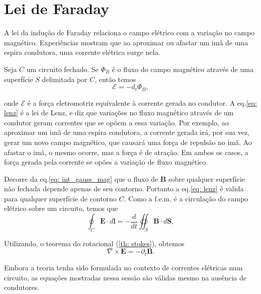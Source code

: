 \section{Lei de Faraday}

A lei da indução de Faraday relaciona o campo elétrico com a variação no campo magnético. Experiências mostram que ao aproximar ou afastar um imâ de uma espira condutora, uma corrente elétrica surge nela. 

Seja $C$ um circuito fechado. Se $\Phi_B$ é o fluxo do campo magnético através de uma superfície $S$ delimitada por $C$, então temos
\begin{equation}
\mathcal{E} = -d_t\Phi_B, 
\label{eq: lenz}
\end{equation}

\noindent onde $\mathcal{E}$ é a força eletromotriz equivalente à corrente gerada no condutor. A eq.\eqref{eq: lenz} é a lei de Lenz, e diz que variações no fluxo magnético através de um condutor geram correntes que se opõem a essa variação. Por exemplo, ao aproximar um imã de uma espira condutora, a corrente gerada irá, por sua vez, gerar um novo campo magnético, que causará uma força de repulsão no imã. Ao afastar o imã, o mesmo ocorre, mas a força é de atração. Em ambos os casos, a força gerada pela corrente se opões a variação de fluxo magnético. 

Decorre da eq.\eqref{eq: int_gauss_mag} que o fluxo de $\mathbf{B}$ sobre qualquer superfície não fechada depende apenas de seu contorno. Portanto a eq.\eqref{eq: lenz} é valida para qualquer superfície de contorno $C$. Como a f.e.m. é a circulação do campo elétrico sobre um circuito, temos que 
\begin{equation}
\oint_C \mathbf{E} \cdot d\mathbf{l} = -\frac{d}{dt} \oiint_S \mathbf{B} \cdot d\mathbf{S},
\end{equation}

\noindent Utilizando, o teorema do rotacional (\ref{th: stokes}), obtemos 
\begin{equation}
\nabla \times \mathbf{E} = - \partial_t \mathbf{B}.
\label{eq: faraday}
\end{equation}

Embora a teoria tenha sido formulada no contexto de correntes elétricas num circuito, as equações mostradas nessa sessão são válidas mesmo na ausência de condutores. 

